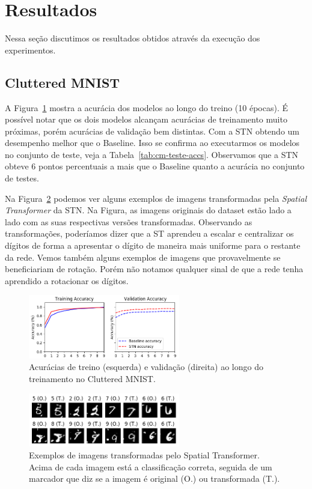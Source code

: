 \documentclass[conference]{IEEEtran}
\begin{document}
\section{Resultados}

Nessa seção discutimos os resultados obtidos através da execução dos experimentos.

\subsection{Cluttered MNIST}

A Figura~\ref{fig:cm-training-accs} mostra a acurácia dos modelos ao longo do treino (10 épocas). É possível notar que os dois modelos alcançam acurácias de treinamento muito próximas, porém acurácias de validação bem distintas. Com a STN obtendo um desempenho melhor que o Baseline. Isso se confirma ao executarmos os modelos no conjunto de teste, veja a Tabela~\ref{tab:cm-teste-accs}. Observamos que a STN obteve 6 pontos percentuais a mais que o Baseline quanto a acurácia no conjunto de testes.

Na Figura~\ref{fig:cm-through-st} podemos ver alguns exemplos de imagens transformadas pela \textit{Spatial Transformer} da STN. Na Figura, as imagens originais do dataset estão lado a lado com as suas respectivas versões transformadas. Observando as transformações, poderíamos dizer que a ST aprendeu a escalar e centralizar os dígitos de forma a apresentar o dígito de maneira mais uniforme para o restante da rede. Vemos também alguns exemplos de imagens  que provavelmente se beneficiariam de rotação. Porém não notamos qualquer sinal de que a rede tenha aprendido a rotacionar os dígitos.

\begin{figure}[ht!]
  \centering
  \includegraphics[width=250px]{img/CM-training-accs.png}
  \caption{Acurácias de treino (esquerda) e validação (direita) ao longo do treinamento no Cluttered MNIST.}
  \label{fig:cm-training-accs}
\end{figure}

\begin{figure}[ht!]
  \centering
  \includegraphics[width=250px]{img/CM-through-st.png}
  \caption{Exemplos de imagens transformadas pelo Spatial Transformer. Acima de cada imagem está a classificação correta, seguida de um marcador que diz se a imagem é original (O.) ou transformada (T.).}
  \label{fig:cm-through-st}
\end{figure}
\end{document}
